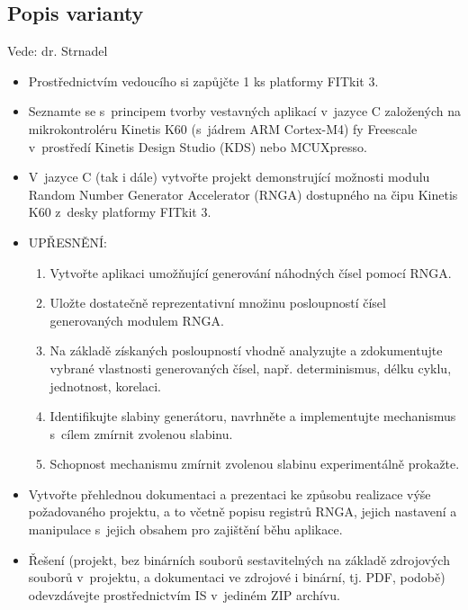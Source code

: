 \documentclass[11pt, a4paper, titlepage]{article}
\begin{document}

\subsection*{Popis varianty}

Vede: dr. Strnadel
\begin{itemize}
    \item Prostřednictvím vedoucího si zapůjčte 1 ks platformy FITkit 3.
    \item Seznamte se s~principem tvorby vestavných aplikací v~jazyce C založených na mikrokontroléru Kinetis K60 (s~jádrem ARM Cortex-M4) fy Freescale v~prostředí Kinetis Design Studio (KDS) nebo MCUXpresso.
    \item V~jazyce C (tak i dále) vytvořte projekt demonstrující možnosti modulu Random Number Generator Accelerator (RNGA) dostupného na čipu Kinetis K60 z~desky platformy FITkit 3.
    \item UPŘESNĚNÍ:
    \begin{enumerate}
        \item Vytvořte aplikaci umožňující generování náhodných čísel pomocí RNGA.
        \item Uložte dostatečně reprezentativní množinu posloupností čísel generovaných modulem RNGA.
        \item Na základě získaných posloupností vhodně analyzujte a zdokumentujte vybrané vlastnosti generovaných čísel, např. determinismus, délku cyklu, jednotnost, korelaci.
        \item Identifikujte slabiny generátoru, navrhněte a implementujte mechanismus s~cílem zmírnit zvolenou slabinu.
        \item Schopnost mechanismu zmírnit zvolenou slabinu experimentálně prokažte.
    \end{enumerate}
    \item Vytvořte přehlednou dokumentaci a prezentaci ke způsobu realizace výše požadovaného projektu, a to včetně popisu registrů RNGA, jejich nastavení a manipulace s~jejich obsahem pro zajištění běhu aplikace.
    \item Řešení (projekt, bez binárních souborů sestavitelných na základě zdrojových souborů v~projektu, a dokumentaci ve zdrojové i binární, tj. PDF, podobě) odevzdávejte prostřednictvím IS v~jediném ZIP archívu.
\end{itemize}

\end{document}
